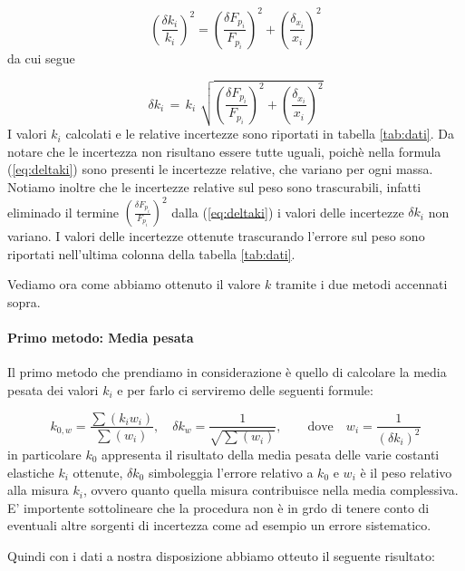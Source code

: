 \begin{equation*}
	\left(\frac{\delta {k_{i}}}{k_{i}}\right)^2 = \left(\frac{\delta F_{p_{i}}}{F_{p_{i}}}\right)^2 + \left(\frac{\delta_{x_{i}}}{x_{i}}\right)^2 
\end{equation*}
%
da cui segue

\begin{equation}
	\delta k_{i} \,=\, k_i\,\, \sqrt{\left(\frac{\delta F_{p_{i}}}{F_{p_{i}}}\right)^2 + \left(\frac{\delta_{x_{i}}}{x_{i}}\right)^2} 
    \label{eq:deltaki}
\end{equation}
%
I valori $k_i$ calcolati e le relative incertezze sono riportati in tabella \ref{tab:dati}. Da notare che le incertezza
non risultano essere tutte uguali, poichè nella formula (\ref{eq:deltaki}) sono presenti le incertezze relative, che
variano per ogni massa. Notiamo inoltre che le incertezze relative sul peso sono trascurabili, infatti eliminado il termine
$\left(\frac{\delta F_{p_{i}}}{F_{p_{i}}}\right)^2$ dalla (\ref{eq:deltaki}) i valori delle incertezze $\delta k_i$ non variano.
I valori delle incertezze ottenute trascurando l'errore sul peso sono riportati nell'ultima colonna della tabella \ref{tab:dati}.

Vediamo ora come abbiamo ottenuto il valore $k$ tramite i due metodi accennati sopra.

\paragraph{Primo metodo: Media pesata\\}

Il primo metodo che prendiamo in considerazione è quello di calcolare la media pesata dei valori $k_{i}$ e per farlo ci serviremo delle seguenti formule:

\begin{equation*}
    k_{0,w} = \frac{\sum (k_i w_i)}{\sum (w_i)} , \quad \delta k_{w} = \frac{1}{\sqrt{\sum (w_i)}} , \qquad \text{dove} \quad w_i = \frac{1}{(\delta k_i)^2}
\end{equation*}
%
in particolare $k_0$ appresenta il risultato della media pesata delle varie costanti elastiche $k_i$ ottenute, $\delta k_0$ simboleggia l'errore relativo a $k_0$ e $w_i$ è il peso relativo alla misura $k_i$, ovvero quanto quella misura contribuisce nella media complessiva. E' importente sottolineare che la procedura non è in grdo di tenere conto di eventuali altre sorgenti di incertezza come ad esempio un errore sistematico.

Quindi con i dati a nostra disposizione abbiamo otteuto il seguente risultato:

